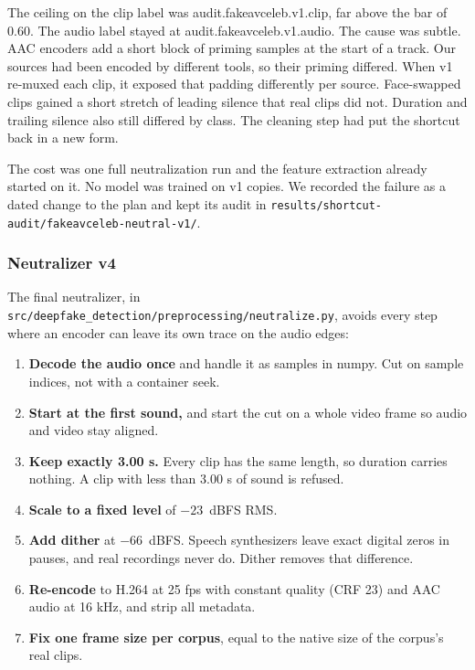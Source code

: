 The ceiling on the clip label was {{audit.fakeavceleb.v1.clip}}, far above the
bar of 0.60. The audio label stayed at {{audit.fakeavceleb.v1.audio}}. The
cause was subtle. AAC encoders add a short block of priming samples at the
start of a track. Our sources had been encoded by different tools, so their
priming differed. When v1 re-muxed each clip, it exposed that padding
differently per source. Face-swapped clips gained a short stretch of leading
silence that real clips did not. Duration and trailing silence also still
differed by class. The cleaning step had put the shortcut back in a new form.

The cost was one full neutralization run and the feature extraction already
started on it. No model was trained on v1 copies. We recorded the failure as a dated change to the plan and kept its audit in
\texttt{results/shortcut-audit/fakeavceleb-neutral-v1/}.

\subsubsection{Neutralizer v4}

The final neutralizer, in
\texttt{src/deepfake\_detection/preprocessing/neutralize.py}, avoids every step
where an encoder can leave its own trace on the audio edges:

\begin{enumerate}
    \item \textbf{Decode the audio once} and handle it as samples in numpy.
    Cut on sample indices, not with a container seek.
    \item \textbf{Start at the first sound,} and start the cut on a whole video
    frame so audio and video stay aligned.
    \item \textbf{Keep exactly 3.00 s.} Every clip has the same length, so
    duration carries nothing. A clip with less than 3.00 s of sound is
    refused.
    \item \textbf{Scale to a fixed level} of $-23$~dBFS RMS.
    \item \textbf{Add dither} at $-66$~dBFS. Speech synthesizers leave exact
    digital zeros in pauses, and real recordings never do. Dither removes
    that difference.
    \item \textbf{Re-encode} to H.264 at 25 fps with constant quality (CRF 23)
    and AAC audio at 16 kHz, and strip all metadata.
    \item \textbf{Fix one frame size per corpus}, equal to the
    native size of the corpus's real clips.
\end{enumerate}


